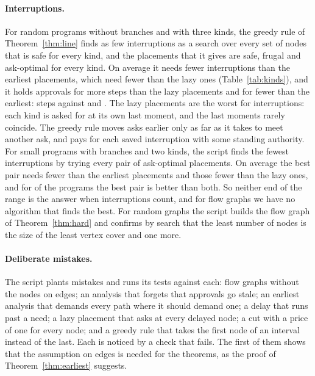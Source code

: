 \documentclass[acmsmall,nonacm,screen]{acmart}
\newcommand{\claim}[2]{#2}
\begin{document}
\paragraph{Interruptions.} \claim{line}{For \exLines{} random programs without branches and
with three kinds, the greedy rule of Theorem~\ref{thm:line} finds as few interruptions as a
search over every set of nodes that is safe for every kind, and the placements that it
gives are safe, frugal and ask-optimal for every kind. On average it needs fewer interruptions than the earliest
placements, which need fewer than the lazy ones (Table~\ref{tab:kinds}), and it holds
approvals for more steps than the lazy placements and for fewer than the earliest:
\exHeldGreedy{} steps against \exHeldLazy{} and \exHeldEarliest{}.} The lazy placements are
the worst for interruptions: each kind is asked for at its own last moment, and the last
moments rarely coincide. The greedy rule moves asks earlier only as far as it takes to meet
another ask, and pays for each saved interruption with some standing authority. \claim{kinds}{For \exBranching{} small programs with branches and
two kinds, the script finds the fewest interruptions by trying every pair of ask-optimal
placements. On average the best pair needs fewer than the earliest placements and those
fewer than the lazy ones, and for \exKindsStrict{} of the programs the best pair is better
than both.} So neither end of the range is the answer when interruptions count, and for
flow graphs we have no algorithm that finds the best. \claim{hard}{For \exCovers{} random
graphs the script builds the flow graph of Theorem~\ref{thm:hard} and confirms by search that
the least number of nodes is the size of the least vertex cover and one more.}

\paragraph{Deliberate mistakes.} The script plants \exMutants{} mistakes and runs its tests
against each: flow graphs without the nodes on edges; an analysis that forgets that
approvals go stale; an earliest analysis that demands every path where it should demand
one; a delay that runs past a need; a lazy placement that asks at every delayed node; a
cut with a price of one for every node; and a greedy rule that takes the first node of an
interval instead of the last. \claim{all-noticed}{Each is noticed by a check that fails.}
The first of them shows that the assumption on edges is needed for the theorems, as the
proof of Theorem~\ref{thm:earliest} suggests.
\end{document}
